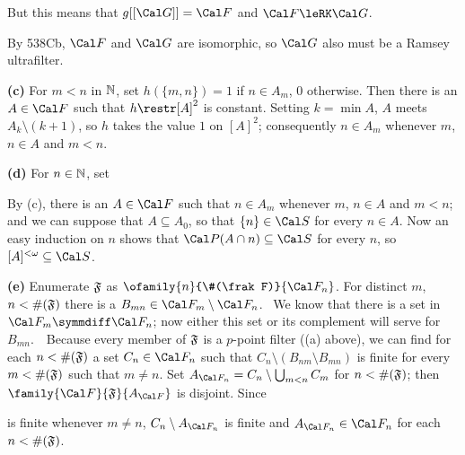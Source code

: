 {

\noindent But this means that $g[[\Cal G]]=\Cal F$ and $\Cal F\leRK\Cal G$.

By 538Cb, $\Cal F$ and $\Cal G$ are isomorphic, so $\Cal G$ also must be a
Ramsey ultrafilter.

\medskip

{\bf (c)} For $m<n$ in $\Bbb N$, set $h(\{m,n\})=1$ if $n\in A_m$, $0$
otherwise.   Then there is an $A\in\Cal F$ such that $h\restr[A]^2$ is
constant.   Setting $k=\min A$, $A$ meets $A_k\setminus(k+1)$, so $h$ takes
the value $1$ on $[A]^2$;   consequently
$n\in A_m$ whenever $m$, $n\in A$ and $m<n$.

\medskip

{\bf (d)} For $n\in\Bbb N$, set


\noindent By (c), there is an $A\in\Cal F$ such that $n\in A_m$ whenever
$m$, $n\in A$ and $m<n$;  and we can suppose that $A\subseteq A_0$, so that
$\{n\}\in\Cal S$ for every $n\in A$.   Now an easy induction on $n$ shows
that $\Cal P(A\cap n)\subseteq\Cal S$ for every $n$, so
$[A]^{<\omega}\subseteq\Cal S$.

\medskip

{\bf (e)} Enumerate $\frak F$ as $\ofamily{n}{\#(\frak F)}{\Cal F_n}$.
For distinct $m$, $n<\#(\frak F)$ there is a
$B_{mn}\in\Cal F_m\setminus\Cal F_n$.
\Prf\ We know that there is a set in $\Cal F_m\symmdiff\Cal F_n$;  now
either this set or its complement will serve for $B_{mn}$.\ \QeD\  Because
every member of $\frak F$ is a $p$-point filter ((a) above), we can find
for each $n<\#(\frak F)$ a set $C_n\in\Cal F_n$ such that
$C_n\setminus(B_{nm}\setminus B_{mn})$ is finite for every $m<\#(\frak F)$
such that $m\ne n$.   Set $A_{\Cal F_n}=C_n\setminus\bigcup_{m<n}C_m$ for
$n<\#(\frak F)$;  then $\family{\Cal F}{\frak F}{A_{\Cal F}}$ is disjoint.
Since


\noindent is finite whenever $m\ne n$, $C_n\setminus A_{\Cal F_n}$ is
finite and  $A_{\Cal F_n}\in\Cal F_n$ for each $n<\#(\frak F)$.

\medskip

}
